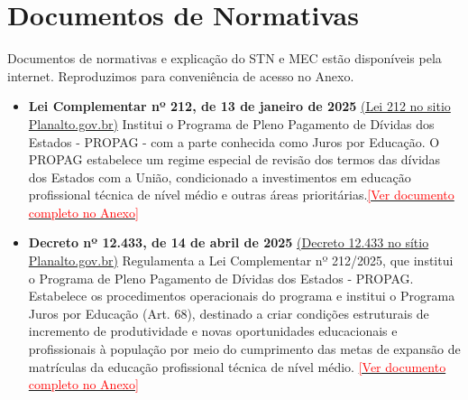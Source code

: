 \vspace{1cm}

\section{Documentos de Normativas}




Documentos de normativas e explicação do STN e MEC estão disponíveis pela internet. Reproduzimos para conveniência de acesso no Anexo.

\begin{itemize}
\item \textbf{Lei Complementar nº 212, de 13 de janeiro de 2025} \href{https://www.planalto.gov.br/ccivil_03/LEIS/LCP/Lcp212.htm}{(Lei 212 no sitio Planalto.gov.br)}  Institui o Programa de Pleno Pagamento de Dívidas dos Estados - PROPAG - com a parte conhecida como Juros por Educação. O PROPAG estabelece um regime especial de revisão dos termos das dívidas dos Estados com a União, condicionado a investimentos em educação profissional técnica de nível médio e outras áreas prioritárias.\hyperref[anexo:lei_propag]{\textcolor{red}{[Ver documento completo no Anexo]}}

\vspace{2em}

\item \textbf{Decreto nº 12.433, de 14 de abril de 2025} 
\href{https://www.planalto.gov.br/ccivil_03/_ato2023-2026/2025/decreto/d12433.htm}{(Decreto 12.433 no sítio Planalto.gov.br)} 
Regulamenta a Lei Complementar nº 212/2025, que institui o Programa de Pleno Pagamento de Dívidas dos Estados - PROPAG. Estabelece os procedimentos operacionais do programa e institui o Programa Juros por Educação (Art. 68), destinado a criar condições estruturais de incremento de produtividade e novas oportunidades educacionais e profissionais à população por meio do cumprimento das metas de expansão de matrículas da educação profissional técnica de nível médio.
\hyperref[anexo:decreto_propag]{\textcolor{red}{[Ver documento completo no Anexo]}}

\vspace{2em}



\end{itemize}




